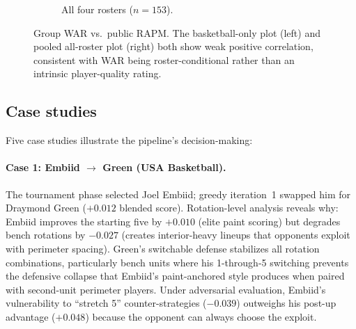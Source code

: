 \documentclass[11pt,letterpaper]{article}
\begin{document}
\begin{figure}[htbp]
\begin{subfigure}[t]{0.49\textwidth}
  \caption{All four rosters ($n = 153$).}
  \label{fig:war-rapm-individual}
  \end{subfigure}
  \caption{Group WAR vs.\ public RAPM. The basketball-only plot
    (left) and pooled all-roster plot (right) both show weak positive
    correlation, consistent with WAR being roster-conditional rather
    than an intrinsic player-quality rating.}
  \label{fig:war-rapm-comparison}
\end{figure}

\subsection{Case studies}

Five case studies illustrate the pipeline's decision-making:

\paragraph{Case 1: Embiid $\to$ Green (USA Basketball).}
The tournament phase selected Joel Embiid; greedy iteration~1 swapped
him for Draymond Green ($+0.012$ blended score). Rotation-level
analysis reveals why: Embiid improves the starting five by $+0.010$
(elite paint scoring) but degrades bench rotations by $-0.027$
(creates interior-heavy lineups that opponents exploit with perimeter
spacing). Green's switchable defense stabilizes all rotation
combinations, particularly bench units where his 1-through-5 switching
prevents the defensive collapse that Embiid's paint-anchored style
produces when paired with second-unit perimeter players. Under
adversarial evaluation, Embiid's vulnerability to ``stretch 5''
counter-strategies ($-0.039$) outweighs his post-up advantage
($+0.048$) because the opponent can always choose the exploit.
\end{document}
